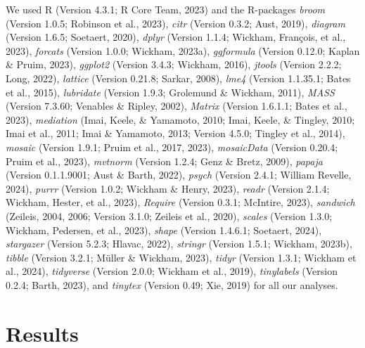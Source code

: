 \documentclass[
  man,floatsintext]{apa7}
\begin{document}
We used R (Version 4.3.1; R Core Team, 2023) and the R-packages \emph{broom} (Version 1.0.5; Robinson et al., 2023), \emph{citr} (Version 0.3.2; Aust, 2019), \emph{diagram} (Version 1.6.5; Soetaert, 2020), \emph{dplyr} (Version 1.1.4; Wickham, François, et al., 2023), \emph{forcats} (Version 1.0.0; Wickham, 2023a), \emph{ggformula} (Version 0.12.0; Kaplan \& Pruim, 2023), \emph{ggplot2} (Version 3.4.3; Wickham, 2016), \emph{jtools} (Version 2.2.2; Long, 2022), \emph{lattice} (Version 0.21.8; Sarkar, 2008), \emph{lme4} (Version 1.1.35.1; Bates et al., 2015), \emph{lubridate} (Version 1.9.3; Grolemund \& Wickham, 2011), \emph{MASS} (Version 7.3.60; Venables \& Ripley, 2002), \emph{Matrix} (Version 1.6.1.1; Bates et al., 2023), \emph{mediation} (Imai, Keele, \& Yamamoto, 2010; Imai, Keele, \& Tingley, 2010; Imai et al., 2011; Imai \& Yamamoto, 2013; Version 4.5.0; Tingley et al., 2014), \emph{mosaic} (Version 1.9.1; Pruim et al., 2017, 2023), \emph{mosaicData} (Version 0.20.4; Pruim et al., 2023), \emph{mvtnorm} (Version 1.2.4; Genz \& Bretz, 2009), \emph{papaja} (Version 0.1.1.9001; Aust \& Barth, 2022), \emph{psych} (Version 2.4.1; William Revelle, 2024), \emph{purrr} (Version 1.0.2; Wickham \& Henry, 2023), \emph{readr} (Version 2.1.4; Wickham, Hester, et al., 2023), \emph{Require} (Version 0.3.1; McIntire, 2023), \emph{sandwich} (Zeileis, 2004, 2006; Version 3.1.0; Zeileis et al., 2020), \emph{scales} (Version 1.3.0; Wickham, Pedersen, et al., 2023), \emph{shape} (Version 1.4.6.1; Soetaert, 2024), \emph{stargazer} (Version 5.2.3; Hlavac, 2022), \emph{stringr} (Version 1.5.1; Wickham, 2023b), \emph{tibble} (Version 3.2.1; Müller \& Wickham, 2023), \emph{tidyr} (Version 1.3.1; Wickham et al., 2024), \emph{tidyverse} (Version 2.0.0; Wickham et al., 2019), \emph{tinylabels} (Version 0.2.4; Barth, 2023), and \emph{tinytex} (Version 0.49; Xie, 2019) for all our analyses.

\hypertarget{results}{%
\section{Results}\label{results}}
\end{document}
